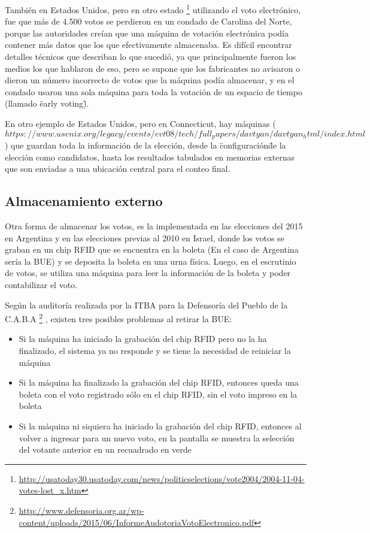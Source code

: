 También en Estados Unidos, pero en otro estado
\footnote{\url{http://usatoday30.usatoday.com/news/politicselections/vote2004/2004-11-04-votes-lost_x.htm}}
 utilizando el voto electrónico, fue que más de 4.500 votos se perdieron en un condado de Carolina del Norte, porque las autoridades creían que una máquina de votación electrónica podía contener más datos que los que efectivamente almacenaba. Es difícil encontrar detalles técnicos que describan lo que sucedió, ya que principalmente fueron los medios los que hablaron de eso, pero se supone que los fabricantes no avisaron o dieron un número incorrecto de votos que la máquina podía almacenar, y en el condado usaron una sola máquina para toda la votación de un espacio de tiempo (llamado \"early voting\").

En otro ejemplo de Estados Unidos, pero en Connecticut, hay máquinas ($https://www.usenix.org/legacy/events/evt08/tech/full_papers/davtyan/davtyan_html/index.html$) que guardan toda la información de la elección, desde la \"configuración\" de la elección como candidatos, hasta los resultados tabulados en memorias externas que son enviadas a una ubicación central para el conteo final.

\subsection{Almacenamiento externo}

Otra forma de almacenar los votos, es la implementada en las elecciones del 2015 en Argentina y en las elecciones previas al 2010 en Israel, donde los votos se graban en un chip RFID que se encuentra en la boleta (En el caso de Argentina sería la BUE) y se deposita la boleta en una urna física. Luego, en el escrutinio de votos, se utiliza una máquina para leer la información de la boleta y poder contabilizar el voto. 

Según la auditoría realizada por la ITBA para la Defensoría del Pueblo de la C.A.B.A
\footnote{\url{http://www.defensoria.org.ar/wp-content/uploads/2015/06/InformeAudotoriaVotoElectronico.pdf}}
, existen tres posibles problemas al retirar la BUE:
\begin{itemize}
	\item Si la máquina ha iniciado la grabación del chip RFID pero no la ha finalizado, el sistema ya no responde y se tiene la necesidad de reiniciar la máquina
	\item Si la máquina ha finalizado la grabación del chip RFID, entonces queda una boleta con el voto registrado sólo en el chip RFID, sin el voto impreso en la boleta
	\item Si la máquina ni siquiera ha iniciado la grabación del chip RFID, entonces al volver a ingresar para un nuevo voto, en la pantalla se muestra la selección del votante anterior en un recuadrado en verde
\end{itemize}


